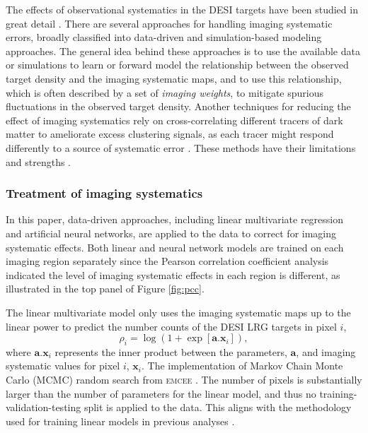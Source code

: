The effects of observational systematics in the DESI targets have been studied in great detail \cite[see, e.g.,][]{kitanidis2020imaging, zhou2021clustering, chaussidon2022angular}. There are several approaches for handling imaging systematic errors, broadly classified into data-driven and simulation-based modeling approaches. The general idea behind these approaches is to use the available data or simulations to learn or forward model the relationship between the observed target density and the imaging systematic maps, and to use this relationship, which is often described by a set of \textit{imaging weights}, to mitigate spurious fluctuations in the observed target density. Another techniques for reducing the effect of imaging systematics rely on cross-correlating different tracers of dark matter to ameliorate excess clustering signals, as each tracer might respond differently to a source of systematic error \citep[see, e.g.,][]{giannantonio2014improved}. These methods have their limitations and strengths \citep[see, e.g.,][for a review]{2021MNRAS.503.5061W}.

\subsubsection{Treatment of imaging systematics}
 In this paper, data-driven approaches, including linear multivariate regression and artificial neural networks, are applied to the data to correct for imaging systematic effects. Both linear and neural network models are trained on each imaging region separately since the Pearson correlation coefficient analysis indicated the level of imaging systematic effects in each region is different, as illustrated in the top panel of Figure \ref{fig:pcc}. 

The linear multivariate model only uses the imaging systematic maps up to the linear power to predict the number counts of the DESI LRG targets in pixel $i$,
\begin{equation}\label{eq:npred}
    \rho_{i} = \log ( 1 + \exp[\textbf{a}.\textbf{x}_{i}]),
\end{equation}
where $\textbf{a}.\textbf{x}_{i}$ represents the inner product between the parameters, $\textbf{a}$, and imaging systematic values for pixel $i$, $\textbf{x}_{i}$. The implementation of Markov Chain Monte Carlo (MCMC) random search from \textsc{emcee} \citep{2013PASP..125..306F} . The number of pixels is substantially larger than the number of parameters for the linear model, and thus no training-validation-testing split is applied to the data. This aligns with the methodology used for training linear models in previous analyses \citep[see, e.g.,][]{zhou2022target}. 


